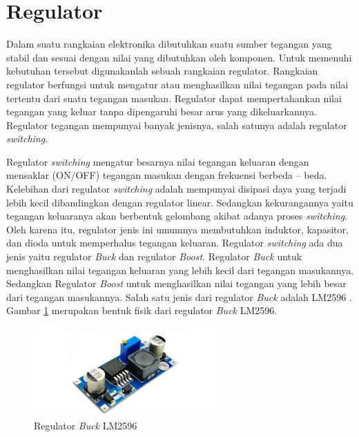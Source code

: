 \section{Regulator}
Dalam suatu rangkaian elektronika dibutuhkan suatu sumber tegangan yang stabil dan sesuai dengan nilai yang dibutuhkan oleh komponen. Untuk memenuhi kebutuhan tersebut digunakanlah sebuah rangkaian regulator. Rangkaian regulator berfungsi untuk mengatur atau menghasilkan nilai tegangan pada nilai tertentu dari suatu tegangan masukan. Regulator dapat mempertahankan nilai tegangan yang keluar tanpa dipengaruhi besar arus yang dikeluarkannya. Regulator tegangan mempunyai banyak jenisnya, salah satunya adalah regulator \textit{switching}.

Regulator \textit{switching} mengatur besarnya nilai tegangan keluaran dengan mensaklar (ON/OFF) tegangan masukan dengan frekuensi berbeda – beda. Kelebihan dari regulator \textit{switching} adalah mempunyai disipasi daya yang terjadi lebih kecil dibandingkan dengan regulator linear. Sedangkan kekurangannya yaitu tegangan keluaranya akan berbentuk gelombang akibat adanya proses \textit{switching}. Oleh karena itu, regulator jenis ini umumnya membutuhkan induktor, kapasitor, dan dioda untuk memperhalus tegangan keluaran. Regulator \textit{switching} ada dua jenis yaitu regulator \textit{Buck} dan regulator \textit{Boost}. Regulator \textit{Buck} untuk menghasilkan nilai tegangan keluaran yang lebih kecil dari tegangan masukannya. Sedangkan Regulator \textit{Boost} untuk menghasilkan nilai tegangan yang lebih besar dari tegangan masukannya. Salah satu jenis dari regulator \textit{Buck} adalah LM2596 . Gambar \ref{pic.lm2596} merupakan bentuk fisik dari regulator \textit{Buck} LM2596.

	\begin{figure}[H]
	\centering
	\includegraphics[width=7cm]{gambar/lm2596.jpg}
	\caption{Regulator \textit{Buck} LM2596}
	\label{pic.lm2596}
\end{figure}

